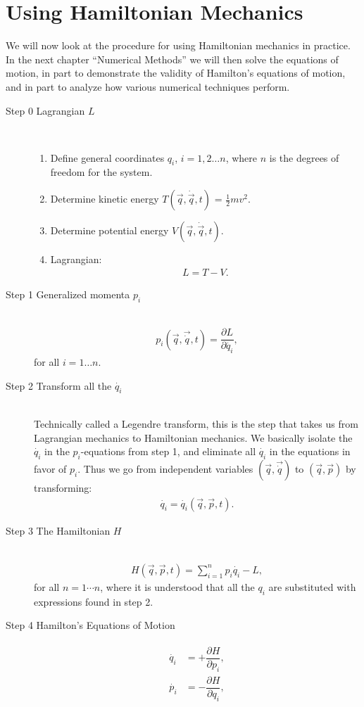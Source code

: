 \section{Using Hamiltonian Mechanics}
We will now look at the procedure for using Hamiltonian mechanics in practice. In the next chapter ``Numerical Methods'' we will then solve the equations of motion, in part to demonstrate the validity of Hamilton's equations of motion, and in part to analyze how various numerical techniques perform.
\begin{description}
\item[Step 0 \quad Lagrangian $L$] \ \\[-0.5cm]
\begin{enumerate}[label=\alph*)]
\item Define general coordinates $q_i$, $i=1,2 \dots n$, where $n$ is the degrees of freedom for the system.
\item Determine kinetic energy $T(\vec{q},\dot{\vec{q}}, t)$ = $\frac{1}{2}m v^2$.
\item Determine potential energy $V(\vec{q},\dot{\vec{q}}, t)$.
\item Lagrangian: \begin{align}
L = T - V.
\end{align}
\end{enumerate}
\item[Step 1 \quad Generalized momenta $p_i$] \ \\[-0.5cm]
\begin{align}
p_i(\vec{q},\vec{\dot{q}}, t) = \dfrac{\partial L}{\partial \dot{q_i}},
\end{align}
for all $i = 1 \dots n$.
%
\item[Step 2 \quad Transform all the $\dot{q_i}$] \ \\[0.5cm]
Technically called a Legendre transform, this is the step that takes us from Lagrangian mechanics to Hamiltonian mechanics. We basically isolate the $\dot{q_i}$ in the $p_i$-equations from step 1, and eliminate all $\dot{q_i}$ in the equations in favor of $p_i$. Thus we go from independent variables $(\vec{q}, \vec{\dot{q}})$ to $(\vec{q}, \vec{p})$ by transforming:
\begin{align}
\dot{q_i} = \dot{q_i}(\vec{q}, \vec{p}, t).
\end{align}
%
\item[Step 3 \quad The Hamiltonian $H$] \ \\[-0.5cm]
\begin{align}
H(\vec{q}, \vec{p}, t) = \sum\limits_{i=1}^n p_i \dot{q_i} - L,
\end{align}
for all $n=1\cdots n$, where it is understood that all the $q_i$ are substituted with expressions found in step 2.
%
\item[Step 4 \quad Hamilton's Equations of Motion]
\begin{align}
\begin{split}
\dot{q_i} &= +\dfrac{\partial H}{\partial p_i},
\\[0.2cm]
\dot{p_i} &= -\dfrac{\partial H}{\partial q_i},
\end{split}
\end{align}
\end{description}
